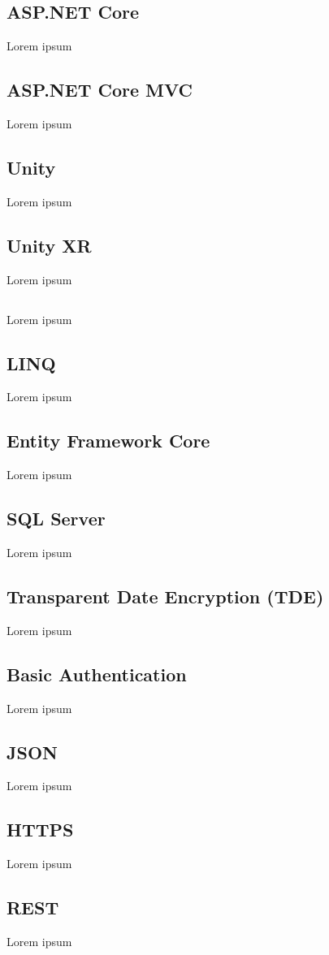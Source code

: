 \subsection*{ASP.NET Core}

Lorem ipsum

\subsection*{ASP.NET Core MVC}
Lorem ipsum
\subsection*{Unity}
Lorem ipsum
\subsection*{Unity XR}
Lorem ipsum
\subsection*{\C}
Lorem ipsum
\subsection*{LINQ}
Lorem ipsum
\subsection*{Entity Framework Core}
Lorem ipsum
\subsection*{SQL Server}
Lorem ipsum
\subsection*{Transparent Date Encryption (TDE)}
Lorem ipsum
\subsection*{Basic Authentication}
Lorem ipsum
\subsection*{JSON}
Lorem ipsum
\subsection*{HTTPS}
Lorem ipsum
\subsection*{REST}
Lorem ipsum
